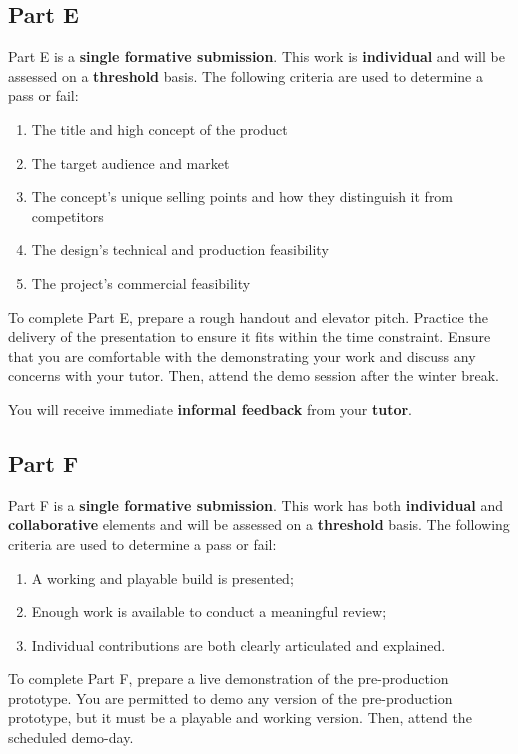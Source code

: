 \documentclass{../../fal_assignment}
\begin{document}
\subsection*{Part E}

Part E is a \textbf{single formative submission}. This work is \textbf{individual} and will be assessed on a \textbf{threshold} basis. The following criteria are used to determine a pass or fail:

\begin{enumerate}[label=(\alph*)]
	\item The title and high concept of the product
	\item The target audience and market
	\item The concept's unique selling points and how they distinguish it from competitors
	\item The design's technical and production feasibility
	\item The project's commercial feasibility
\end{enumerate}

To complete Part E, prepare a rough handout and elevator pitch. Practice the delivery of the presentation to ensure it fits within the time constraint. Ensure that you are comfortable with the demonstrating your work and discuss any concerns with your tutor. Then, attend the demo session after the winter break.

You will receive immediate \textbf{informal feedback} from your \textbf{tutor}.

\subsection*{Part F}

Part F is a \textbf{single formative submission}. This work has both \textbf{individual} and \textbf{collaborative} elements and will be assessed on a \textbf{threshold} basis. The following criteria are used to determine a pass or fail:

\begin{enumerate}[label=(\alph*)]
	\item A working and playable build is presented;
	\item Enough work is available to conduct a meaningful review;
	\item Individual contributions are both clearly articulated and explained.
\end{enumerate}

To complete Part F, prepare a live demonstration of the pre-production prototype. You are permitted to demo any version of the pre-production prototype, but it must be a playable and working version. Then, attend the scheduled demo-day.
\end{document}
